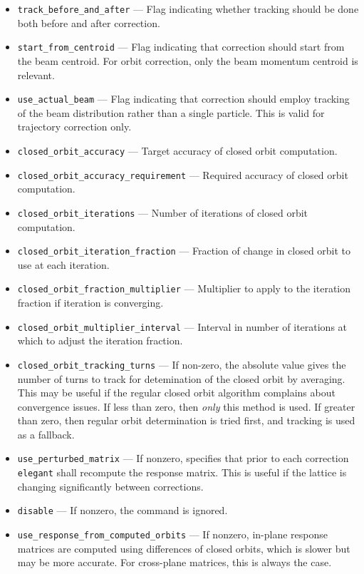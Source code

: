 \documentclass[11pt]{article}
\begin{document}
\begin{itemize}
\item \verb|track_before_and_after| --- Flag indicating whether tracking should be done both before and after
correction.
\item \verb|start_from_centroid| --- Flag indicating that correction
should start from the beam centroid.  For orbit correction, only the
beam momentum centroid is relevant.
\item \verb|use_actual_beam| --- Flag indicating that correction
should employ tracking of the beam distribution rather than a single
particle.  This is valid for trajectory correction only.
\item \verb|closed_orbit_accuracy| --- Target accuracy of closed orbit computation.
\item \verb|closed_orbit_accuracy_requirement| --- Required accuracy of closed orbit computation.
\item \verb|closed_orbit_iterations| --- Number of iterations of closed orbit computation.
\item \verb|closed_orbit_iteration_fraction| --- Fraction of change in closed orbit to
use at each iteration.
\item \verb|closed_orbit_fraction_multiplier| --- Multiplier to apply to the iteration fraction if
  iteration is converging.
\item \verb|closed_orbit_multiplier_interval| --- Interval in number of iterations at which to adjust
  the iteration fraction.
\item \verb|closed_orbit_tracking_turns| --- If non-zero, the absolute value gives the number of turns to track for detemination 
  of the closed orbit by averaging. This may be useful if the regular closed orbit algorithm
  complains about convergence issues. If less than zero, then {\em only} this method is used. If greater than zero, 
  then regular orbit determination is tried first, and tracking is used as a fallback.
\item \verb|use_perturbed_matrix| --- If nonzero, specifies that prior to each 
	correction \verb|elegant| shall recompute the response matrix.  This
	is useful if the lattice is changing significantly between corrections.
\item \verb|disable| --- If nonzero, the command is ignored.
\item \verb|use_response_from_computed_orbits| --- If nonzero, in-plane response matrices are computed
  using differences of closed orbits, which is slower but may be more accurate. For cross-plane matrices, this is always the case.
\end{itemize}
\end{document}
